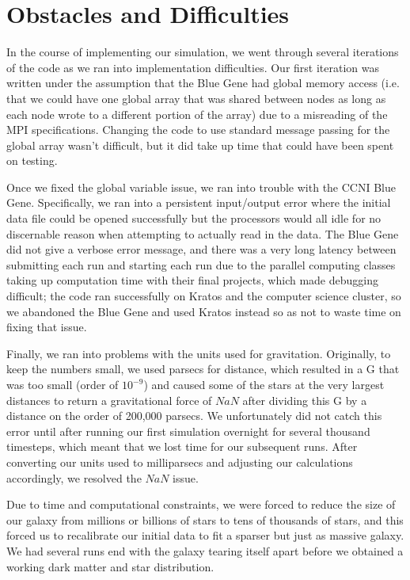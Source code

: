 \documentclass{article}
\begin{document}
\section{Obstacles and Difficulties}

In the course of implementing our simulation, we went through several iterations of the code as we ran into implementation difficulties.  Our first iteration was written under the assumption that the Blue Gene had global memory access (i.e. that we could have one global array that was shared between nodes as long as each node wrote to a different portion of the array) due to a misreading of the MPI specifications.  Changing the code to use standard message passing for the global array wasn't difficult, but it did take up time that could have been spent on testing.

Once we fixed the global variable issue, we ran into trouble with the CCNI Blue Gene.  Specifically, we ran into a persistent input/output error where the initial data file could be opened successfully but the processors would all idle for no discernable reason when attempting to actually read in the data.  The Blue Gene did not give a verbose error message, and there was a very long latency between submitting each run and starting each run due to the parallel computing classes taking up computation time with their final projects, which made debugging difficult; the code ran successfully on Kratos and the computer science cluster, so we abandoned the Blue Gene and used Kratos instead so as not to waste time on fixing that issue.

Finally, we ran into problems with the units used for gravitation.  Originally, to keep the numbers small, we used parsecs for distance, which resulted in a G that was too small (order of $10^{-9}$) and caused some of the stars at the very largest distances to return a gravitational force of $NaN$ after dividing this G by a distance on the order of 200,000 parsecs.  We unfortunately did not catch this error until after running our first simulation overnight for several thousand timesteps, which meant that we lost time for our subsequent runs.  After converting our units used to milliparsecs and adjusting our calculations accordingly, we resolved the $NaN$ issue.

Due to time and computational constraints, we were forced to reduce the size of our galaxy from millions or billions of stars to tens of thousands of stars, and this forced us to recalibrate our initial data to fit a sparser but just as massive galaxy.  We had several runs end with the galaxy tearing itself apart before we obtained a working dark matter and star distribution.
\end{document}
